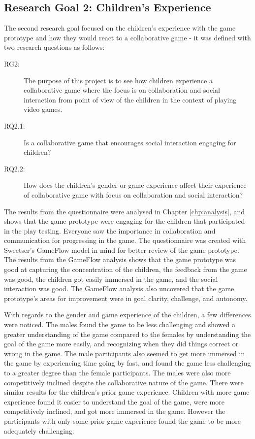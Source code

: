 \subsection{Research Goal 2: Children's Experience}
The second research goal focused on the children's experience with the game prototype and how they would react to a collaborative game - it was defined with two research questions as follows:
\begin{description}
		\item[RG2:] The purpose of this project is to see how children experience a collaborative game where the focus is on collaboration and social interaction from point of view of the children in the context of playing video games.
		\item[RQ2.1:] Is a collaborative game that encourages social interaction engaging for children?
		\item[RQ2.2:] How does the children's gender or game experience affect their experience of collaborative game with focus on collaboration and social interaction?
\end{description}
The results from the questionnaire were analysed in Chapter \ref{chp:analysis}, and shows that the game prototype were engaging for the children that participated in the play testing. Everyone saw the importance in collaboration and communication for progressing in the game. The questionnaire was created with Sweetser's \cite{sweetser2005gameflow} GameFlow model in mind for better review of the game prototype. The results from the GameFlow analysis shows that the game prototype was good at capturing the concentration of the children, the feedback from the game was good, the children got easily immersed in the game, and the social interaction was good. The GameFlow analysis also uncovered that the game prototype's areas for improvement were in goal clarity, challenge, and autonomy.

With regards to the gender and game experience of the children, a few differences were noticed. The males found the game to be less challenging and showed a greater understanding of the game compared to the females by understanding the goal of the game more easily, and recognizing when they did things correct or wrong in the game. The male participants also seemed to get more immersed in the game by experiencing time going by fast, and found the game less challenging to a greater degree than the female participants. The males were also more competitively inclined despite the collaborative nature of the game. There were similar results for the children's prior game experience. Children with more game experience found it easier to understand the goal of the game, were more competitively inclined, and got more immersed in the game. However the participants with only some prior game experience found the game to be more adequately challenging.

